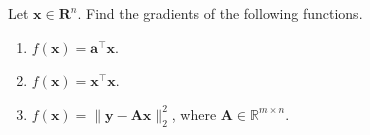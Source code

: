 \documentclass[11pt,letter,notitlepage]{article}
\begin{document}
\begin{solution}
\begin{enumerate}
\begin{enumerate}
\begin{enumerate}

			            \end{enumerate}
		      \end{enumerate}
	\end{enumerate}
\end{solution}
\newpage

\begin{exercise}
	Let $\mathbf{x}\in \mathbf{R}^n$. Find the gradients of the following functions.
	\begin{enumerate}
		\item $f(\mathbf{x}) = \mathbf{a}^{\top}\mathbf{x}$.
		\item $f(\mathbf{x}) = \mathbf{x}^{\top}\mathbf{x}$.
		\item $f(\mathbf{x})=\| \mathbf{y} - \mathbf{A}\mathbf{x} \|_2^2$, where $\mathbf{A}\in\mathbb{R}^{m\times n}$.
	\end{enumerate}
\end{exercise}
\end{document}
